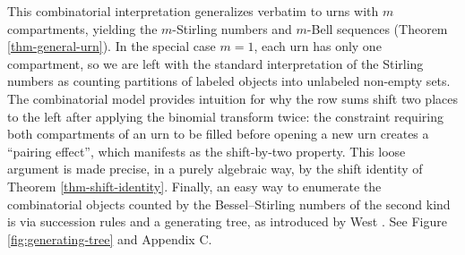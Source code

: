 \documentclass[a4paper]{amsart}
\numberwithin{equation}{section}
\begin{document}
This combinatorial interpretation generalizes verbatim to urns with $m$ compartments, yielding the $m$-Stirling numbers and $m$-Bell sequences (Theorem \ref{thm-general-urn}). In the special case $m=1$, each urn has only one compartment, so we are left with the standard interpretation of the Stirling numbers as counting partitions of labeled objects into unlabeled non-empty sets. The combinatorial model provides intuition for why the row sums shift two places to the left after applying the binomial transform twice: the constraint requiring both compartments of an urn to be filled before opening a new urn creates a ``pairing effect'', which manifests as the shift-by-two property. This loose argument is made precise, in a purely algebraic way, by the shift identity of Theorem \ref{thm-shift-identity}. Finally, an easy way to enumerate the combinatorial objects counted by the Bessel--Stirling numbers of the second kind is via succession rules and a generating tree, as introduced by West \cite{west_generating_1995}. See Figure \ref{fig:generating-tree} and Appendix C.
\end{document}
